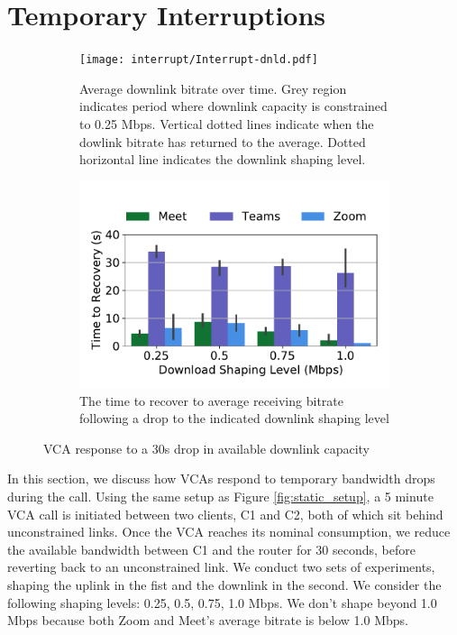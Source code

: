 \section{Temporary Interruptions}
\label{sec:interruption}



\begin{figure}[]
\begin{subfigure}[t]{.5\textwidth}
   \centering
    \texttt{[image: interrupt/Interrupt-dnld.pdf]}
    \captionsetup{width=.9\linewidth}
    \caption{Average downlink bitrate over time. Grey region indicates period where downlink capacity is constrained to 0.25 Mbps. Vertical dotted lines indicate when the dowlink bitrate has returned to the average. Dotted horizontal line indicates the downlink shaping level.}
    \label{fig:ts-dnld}
\end{subfigure}
\begin{subfigure}[t]{.5\textwidth}
  \centering
    \includegraphics[width=1\textwidth,keepaspectratio]{../figures/interrupt/TTR-dnld.pdf}
    \captionsetup{width=.9\linewidth}
    \caption{The time to recover to average receiving bitrate following a drop to the indicated downlink shaping level}
    \label{fig:TTR_dnld}
\end{subfigure}
\caption{VCA response to a 30s drop in available downlink capacity}
\label{fig:interrupt-dnld}
\end{figure}


In this section, we discuss how VCAs respond to temporary bandwidth drops during the call. Using the same setup as Figure \ref{fig:static_setup}, a 5 minute VCA call is initiated between two clients, C1 and C2, both of which sit behind unconstrained links. Once the VCA reaches its nominal consumption, we reduce the available bandwidth between C1 and the router for 30 seconds, before reverting back to an unconstrained link. We conduct two sets of experiments, shaping the uplink in the fist and the downlink in the second. We consider the following shaping levels: {0.25, 0.5, 0.75, 1.0} Mbps. We don't shape beyond 1.0 Mbps because both Zoom and Meet's average bitrate is below 1.0 Mbps.


